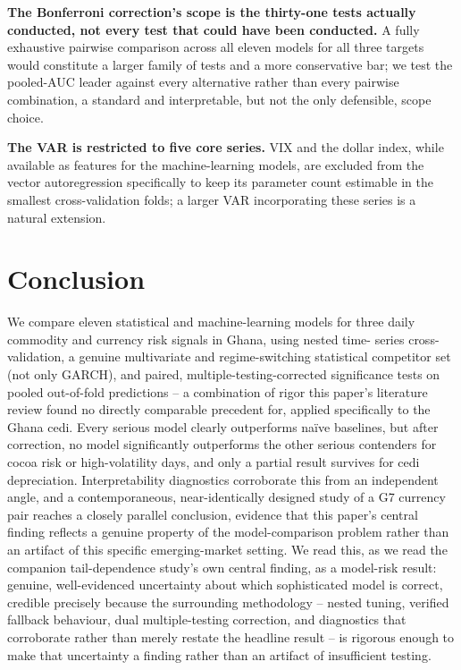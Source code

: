 \documentclass[final,3p,times,authoryear]{elsarticle}
\begin{document}
\textbf{The Bonferroni correction's scope is the thirty-one tests
actually conducted, not every test that could have been conducted.} A
fully exhaustive pairwise comparison across all eleven models for all
three targets would constitute a larger family of tests and a more
conservative bar; we test the pooled-AUC leader against every
alternative rather than every pairwise combination, a standard and
interpretable, but not the only defensible, scope choice.

\textbf{The VAR is restricted to five core series.} VIX and the dollar
index, while available as features for the machine-learning models, are
excluded from the vector autoregression specifically to keep its
parameter count estimable in the smallest cross-validation folds; a
larger VAR incorporating these series is a natural extension.

\section{Conclusion}
\label{sec:conclusion}

We compare eleven statistical and machine-learning models for three
daily commodity and currency risk signals in Ghana, using nested time-
series cross-validation, a genuine multivariate and regime-switching
statistical competitor set (not only GARCH), and paired,
multiple-testing-corrected significance tests on pooled out-of-fold
predictions -- a combination of rigor this paper's literature review
found no directly comparable precedent for, applied specifically to the
Ghana cedi. Every serious model clearly outperforms na\"ive baselines,
but after correction, no model significantly outperforms the other
serious contenders for cocoa risk or high-volatility days, and only a
partial result survives for cedi depreciation. Interpretability
diagnostics corroborate this from an independent angle, and a
contemporaneous, near-identically designed study of a G7 currency pair
reaches a closely parallel conclusion, evidence that this paper's
central finding reflects a genuine property of the model-comparison
problem rather than an artifact of this specific emerging-market
setting. We read this, as we read the companion tail-dependence study's
own central finding, as a model-risk result: genuine, well-evidenced
uncertainty about which sophisticated model is correct, credible
precisely because the surrounding methodology -- nested tuning,
verified fallback behaviour, dual multiple-testing correction, and
diagnostics that corroborate rather than merely restate the headline
result -- is rigorous enough to make that uncertainty a finding rather
than an artifact of insufficient testing.
\end{document}

